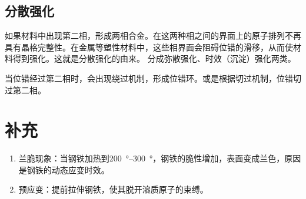         \subsection{分散强化}
            如果材料中出现第二相，形成两相合金。在这两种相之间的界面上的原子排列不再具有晶格完整性。在金属等塑性材料中，这些相界面会阻碍位错的滑移，从而使材料得到强化。这就是分散强化的由来。
            分成弥散强化、时效（沉淀）强化两类。

            当位错经过第二相时，会出现绕过机制，形成位错环。或是根据切过机制，位错切过第二相。
        
    \section{补充}
        \begin{enumerate}
            \item 兰脆现象：当钢铁加热到\SIrange{200}{300}{\degree}，钢铁的脆性增加，表面变成兰色，原因是钢铁的动态应变时效。
            \item 预应变：提前拉伸钢铁，使其脱开溶质原子的束缚。
        \end{enumerate}